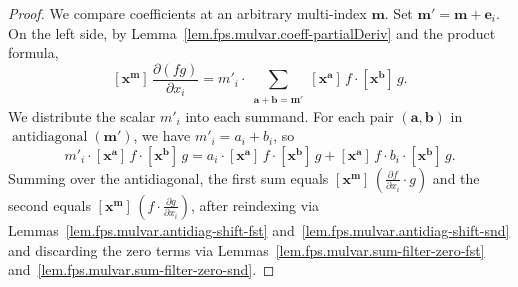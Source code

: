 \begin{proof}
We compare coefficients at an arbitrary multi-index $\mathbf{m}$.
Set $\mathbf{m}' = \mathbf{m} + \mathbf{e}_i$.
On the left side, by Lemma~\ref{lem.fps.mulvar.coeff-partialDeriv} and the
product formula,
\[
[\mathbf{x}^{\mathbf{m}}]\, \frac{\partial(fg)}{\partial x_i}
= m'_i \cdot \sum_{\substack{\mathbf{a}+\mathbf{b}=\mathbf{m}'}}
  [\mathbf{x}^{\mathbf{a}}]\, f \cdot [\mathbf{x}^{\mathbf{b}}]\, g.
\]
We distribute the scalar $m'_i$ into each summand. For each pair
$(\mathbf{a},\mathbf{b})$ in $\operatorname{antidiagonal}(\mathbf{m}')$,
we have $m'_i = a_i + b_i$, so
\[
m'_i \cdot [\mathbf{x}^{\mathbf{a}}]\, f \cdot [\mathbf{x}^{\mathbf{b}}]\, g
= a_i \cdot [\mathbf{x}^{\mathbf{a}}]\, f \cdot [\mathbf{x}^{\mathbf{b}}]\, g
  + [\mathbf{x}^{\mathbf{a}}]\, f \cdot b_i \cdot [\mathbf{x}^{\mathbf{b}}]\, g.
\]
Summing over the antidiagonal, the first sum equals
$[\mathbf{x}^{\mathbf{m}}]\, (\frac{\partial f}{\partial x_i} \cdot g)$
and the second equals
$[\mathbf{x}^{\mathbf{m}}]\, (f \cdot \frac{\partial g}{\partial x_i})$,
after reindexing via Lemmas~\ref{lem.fps.mulvar.antidiag-shift-fst}
and~\ref{lem.fps.mulvar.antidiag-shift-snd} and discarding the zero
terms via Lemmas~\ref{lem.fps.mulvar.sum-filter-zero-fst}
and~\ref{lem.fps.mulvar.sum-filter-zero-snd}.
\end{proof}
